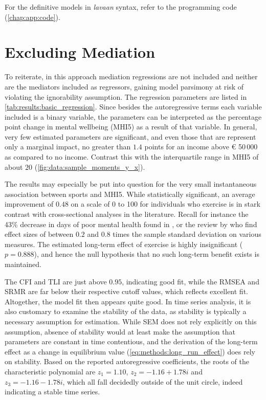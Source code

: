 For the definitive models in \textit{lavaan} syntax, refer to the programming code (\cref{chap:app:code}).

\section{Excluding Mediation}
\label{sec:results:no_mediation}

To reiterate, in this approach mediation regressions are not included and neither are the mediators included as regressors,
gaining model parsimony at risk of violating the ignorability assumption.
The regression parameters are listed in \cref{tab:results:basic_regression}. Since besides the autoregressive
terms each variable included is a binary variable, the parameters can be interpreted as the percentage point change
in mental wellbeing (MHI5) as a result of that variable.
In general, very few estimated parameters are significant, and even those that are represent only a marginal impact,
no greater than $1.4$ points for an income above € 50\,000 as compared to no income. Contrast this with the interquartile
range in MHI5 of about $20$ (\cref{fig:data:sample_moments_y_x}).

The results may especially be put into question for the very small instantaneous association between sports and MHI5.
While statistically significant, an average improvement of $0.48$ on a scale of 0 to 100 for individuals who exercise
is in stark contrast with cross-sectional analyses in the literature. Recall for instance the 43\% decrease in days of poor mental
health found in , or the review by  who find effect sizes of between
$0.2$ and $0.8$ times the sample standard deviation on various measures.
The estimated long-term effect of exercise is highly insignificant ($p = 0.888$), and hence the null hypothesis that
no such long-term benefit exists is maintained.

The CFI and TLI are just above $0.95$, indicating good fit, while the RMSEA and SRMR are far below their respective
cutoff values, which reflects excellent fit. Altogether, the model fit then appears quite good.
In time series analysis, it is also customary to examine the stability of the data, as stability is typically a necessary
assumption for estimation. While SEM does not rely explicitly on this assumption, absence of stability would at least make the
assumption that parameters are constant in time contentious, and the derivation of the long-term effect as a change
in equilibrium value (\cref{eq:methods:long_run_effect}) does rely on stability.
Based on the reported autoregressive coefficients, the roots of the characteristic polynomial are $z_1 = 1.10$,
$z_2 = -1.16 + 1.78i$ and $z_3 = -1.16 - 1.78i$, which all fall decidedly outside of the unit circle,
indeed indicating a stable time series.

